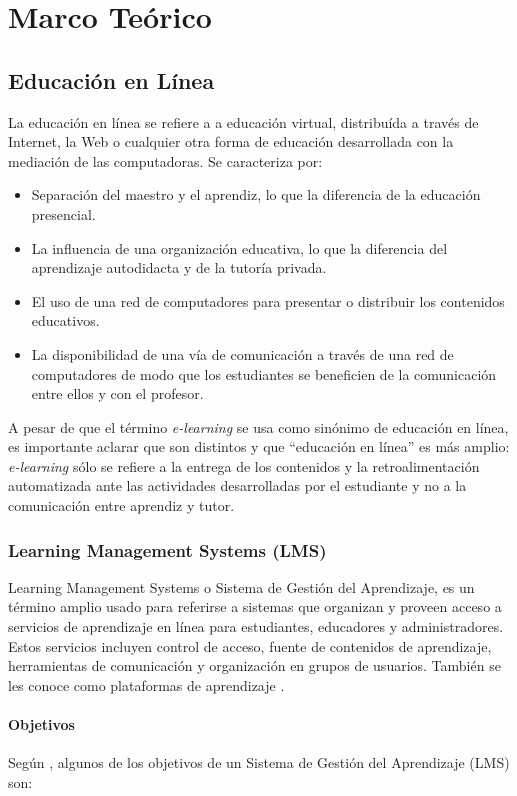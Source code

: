 \chapter{Marco Teórico}
\section{Educación en Línea}
La educación en línea se refiere a a educación virtual, distribuída a través de Internet, la Web o cualquier otra forma de educación desarrollada con la mediación de las computadoras. Se caracteriza por:
\begin{itemize}
	\item Separación del maestro y el aprendiz, lo que la diferencia de la educación presencial.
	\item La influencia de una organización educativa, lo que la diferencia del aprendizaje autodidacta y de la tutoría privada.
	\item El uso de una red de computadores para presentar o distribuir los contenidos educativos.
	\item La disponibilidad de una vía de comunicación a través de una red de computadores de modo que los estudiantes se beneficien de la comunicación entre ellos y con el profesor.
\end{itemize}

A pesar de que el término \emph{e-learning} se usa como sinónimo de educación en línea, es importante aclarar que son distintos y que ``educación en línea'' es más amplio: \emph{e-learning} sólo se refiere a la entrega de los contenidos y la retroalimentación automatizada ante las actividades desarrolladas por el estudiante y no a la comunicación entre aprendiz y tutor. \citep{Paulsen2002}

\subsection{Learning Management Systems (LMS)}
Learning Management Systems o Sistema de Gestión del Aprendizaje, es un término amplio usado para referirse a sistemas que organizan y proveen acceso a servicios de aprendizaje en línea para estudiantes, educadores y administradores. Estos servicios incluyen control de acceso, fuente de contenidos de aprendizaje, herramientas de comunicación y organización en grupos de usuarios. También se les conoce como plataformas de aprendizaje \citep{Paulsen2002}.

\subsubsection{Objetivos}
Según \citeauthor{Hall2002}, algunos de los objetivos de un Sistema de Gestión del Aprendizaje (LMS) son:

